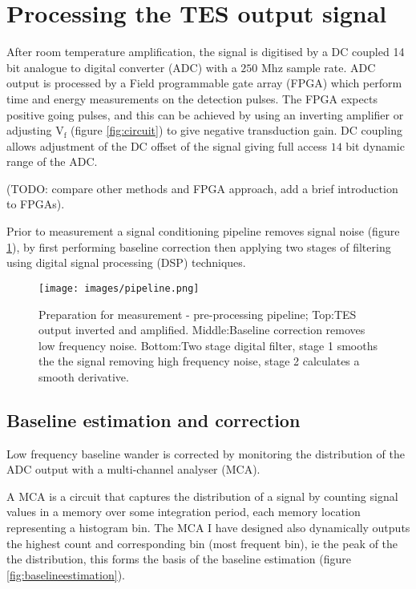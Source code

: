 \documentclass{article}
\begin{document}
\section{Processing the TES output signal}
After room temperature amplification, the signal is digitised by a DC coupled 14
bit analogue to digital converter (ADC) with a $250$ Mhz sample rate. ADC output
is processed by a Field programmable gate array (FPGA) which perform time and
energy measurements on the detection pulses. The FPGA expects positive going
pulses, and this can be  achieved by using an inverting amplifier or adjusting
$\mathrm{V}_\mathrm{f}$ (figure \ref{fig:circuit}) to give negative transduction
gain. DC coupling allows adjustment of the DC offset of the signal giving full
access $14$ bit dynamic range of the ADC.

(TODO: compare other methods and FPGA approach, add a brief introduction to
FPGAs).

Prior to measurement a signal conditioning pipeline removes signal noise
(figure \ref{fig:pipeline}), by first performing baseline correction then
applying two stages of filtering using digital signal processing (DSP) 
techniques.

\begin{figure}[!hpbt]
  \centering
  \texttt{[image: images/pipeline.png]}
  \caption{
    Preparation for measurement - pre-processing pipeline; Top:TES output
    inverted and amplified.
    Middle:Baseline correction removes low frequency noise. 
    Bottom:Two stage digital filter,
    stage 1 smooths the the signal removing high frequency noise, stage 2
    calculates a smooth derivative.
  }
  \label{fig:pipeline} 
\end{figure}

\subsection{Baseline estimation and correction}
Low frequency baseline wander is corrected by monitoring the distribution of the
ADC output with a multi-channel analyser (MCA). 


A MCA is a circuit that captures the distribution of a signal by
counting signal values in a memory over some integration period, each
memory location representing a histogram bin. 
The MCA I have designed
also dynamically outputs the highest count and corresponding bin (most frequent
bin), ie the peak of the the distribution, this forms the basis of the baseline
estimation (figure \ref{fig:baselineestimation}). 
\end{document}
